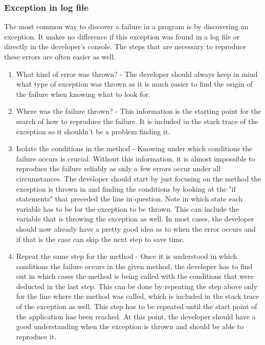 \subsubsection{Exception in log file}
The most common way to discover a failure in a program is by discovering an exception. It makes no difference if this exception was found in a log file or directly in the developer's console. The steps that are necessary to reproduce these errors are often easier as well.

\begin{enumerate}
  \item What kind of error was thrown? - The developer should always keep in mind what type of exception was thrown as it is much easier to find the origin of the failure when knowing what to look for.
  \item Where was the failure thrown? - This information is the starting point for the search of how to reproduce the failure. It is included in the stack trace of the exception so it shouldn't be a problem finding it.
  \item Isolate the conditions in the method - Knowing under which conditions the failure occurs is crucial. Without this information, it is almost impossible to reproduce the failure reliably as only a few errors occur under all circumstances. The developer should start by just focusing on the method the exception is thrown in and finding the conditions by looking at the "if statements" that preceded the line in question. Note in which state each variable has to be for the exception to be thrown. This can include the variable that is throwing the exception as well. In most cases, the developer should now already have a pretty good idea as to when the error occurs and if that is the case can skip the next step to save time.
  \item Repeat the same step for the method - Once it is understood in which conditions the failure occurs in the given method, the developer has to find out in which cases the method is being called with the conditions that were deducted in the last step. This can be done by repeating the step above only for the line where the method was called, which is included in the stack trace of the exception as well. This step has to be repeated until the start point of the application has been reached. At this point, the developer should have a good understanding when the exception is thrown and should be able to reproduce it.
\end{enumerate}

